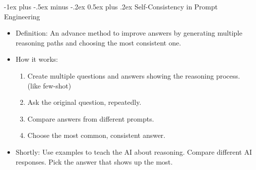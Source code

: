 \documentclass[10pt,landscape]{article}
\makeatletter
\renewcommand{\section}{\@startsection{section}{1}{0mm}%
                                {-1ex plus -.5ex minus -.2ex}%
                                {0.5ex plus .2ex}%
                                {\normalfont\large\bfseries}}
\makeatother
\begin{document}
\begin{multicols}{3}
\section{Self-Consistency in Prompt Engineering}
\begin{itemize}
    \item Definition: An advance method to improve answers by generating multiple reasoning paths and choosing the most consistent one.
    \item How it works:
    \begin{enumerate}
        \item Create multiple questions and answers showing the reasoning process. (like few-shot)
        \item Ask the original question, repeatedly.
        \item Compare answers from different prompts.
        \item Choose the most common, consistent answer.
    \end{enumerate}
    \item Shortly: Use examples to teach the AI about reasoning. Compare different AI responses. Pick the answer that shows up the most.
\end{itemize}

% 
% 
% 


\end{multicols}
\end{document}
